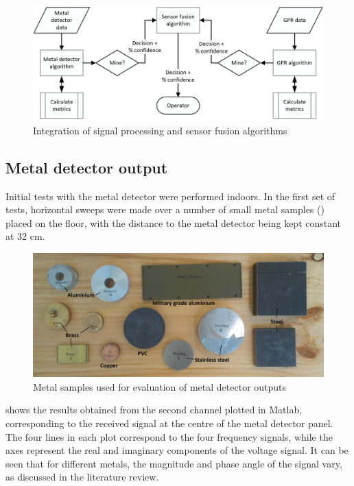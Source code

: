 \documentclass[main.tex]{subfiles}
\begin{document}
\begin{figure}[ht]
\includegraphics[width=\textwidth]{3-ConceptDesign/fusion.PNG}
\centering
\caption{Integration of signal processing and sensor fusion algorithms} 
\end{figure}

\subsection{Metal detector output}
Initial tests with the metal detector were performed indoors. In the first set of tests, horizontal sweeps were made over a number of small metal samples () placed on the floor, with the distance to the metal detector being kept constant at 32 cm. 

\begin{figure}[ht]
\includegraphics[width=\textwidth]{3-ConceptDesign/samples.jpg}
\centering
\caption{Metal samples used for evaluation of metal detector outputs} 
\end{figure}

 shows the results obtained from the second channel plotted in Matlab, corresponding to the received signal at the centre of the metal detector panel. The four lines in each plot correspond to the four frequency signals, while the axes represent the real and imaginary components of the voltage signal. It can be seen that for different metals, the magnitude and phase angle of the signal vary, as discussed in the literature review. 
\end{document}
